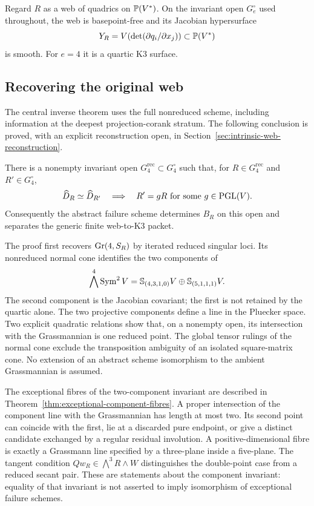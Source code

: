 Regard \(R\) as a web of quadrics on \(\mathbb P(V^*)\).  On the
invariant open \(G_e^\circ\) used throughout, the web is
basepoint-free and its Jacobian hypersurface
\begin{equation}\label{eq:Y-intro}
 Y_R=V\!\left(\det(\partial q_i/\partial x_j)\right)
 \subset\mathbb P(V^*)
\end{equation}
is smooth.  For \(e=4\) it is a quartic K3 surface.


\subsection{Recovering the original web}

The central inverse theorem uses the full nonreduced scheme,
including information at the deepest projection-corank stratum.  The following conclusion is proved, with
an explicit reconstruction open, in
Section~\ref{sec:intrinsic-web-reconstruction}.

\begin{theorem}
\label{thm:main-web-reconstruction}
There is a nonempty invariant open \(G_4^{\mathrm{rec}}\subset
G_4^\circ\) such that, for \(R\in G_4^{\mathrm{rec}}\) and
\(R'\in G_4^\circ\),
\[
 \widehat D_R\simeq\widehat D_{R'}\quad\Longrightarrow\quad
 R'=gR\ \text{for some }g\in\operatorname{PGL}(V).
\]
Consequently the abstract failure scheme determines \(B_R\) on
this open and separates the generic finite web-to-K3 packet.
\end{theorem}

The proof first recovers \(\operatorname{Gr}(4,S_R)\) by iterated reduced
singular loci.  Its nonreduced normal cone identifies the two
components of
\[
 \bigwedge^4\operatorname{Sym}^2V=
 \mathbb S_{(4,3,1,0)}V\oplus\mathbb S_{(5,1,1,1)}V.
\]
The second component is the Jacobian covariant; the first is not
retained by the quartic alone.  The two projective components define a
line in the Pluecker space.  Two explicit quadratic relations show
that, on a nonempty open, its intersection with the Grassmannian is
one reduced point.  The global tensor rulings of the normal cone
exclude the transposition ambiguity of an isolated square-matrix
cone.  No extension of an abstract scheme isomorphism to the ambient
Grassmannian is assumed.


The exceptional fibres of the two-component invariant are described in
Theorem~\ref{thm:exceptional-component-fibres}.  A proper intersection
of the component line with the Grassmannian has length at most two.
Its second point can coincide with the first, lie at a discarded pure
endpoint, or give a distinct candidate exchanged by a regular residual
involution.  A positive-dimensional fibre is exactly a Grassmann line
specified by a three-plane inside a five-plane.  The tangent condition
\(Qw_R\in\bigwedge^3R\wedge W\) distinguishes the double-point
case from a reduced secant pair.  These are statements about the
component invariant: equality of that invariant is not asserted to
imply isomorphism of exceptional failure schemes.


